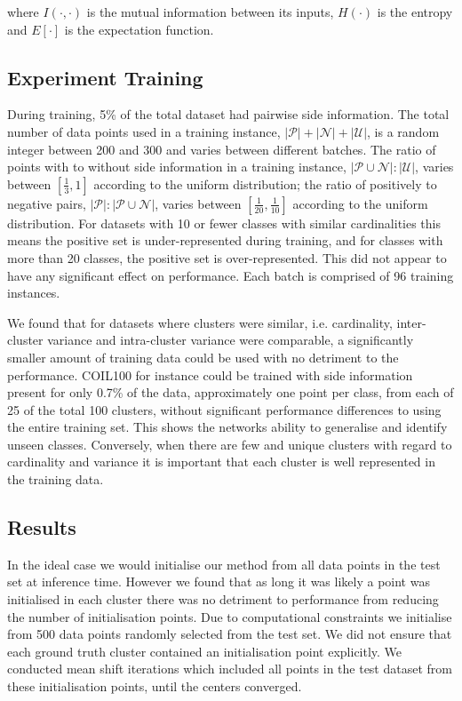 \documentclass[letterpaper, 11pt]{IEEEtran}
\begin{document}
where $ I(\cdot,\cdot)$ is the mutual information between its inputs, $H(\cdot)$ is the entropy and $E[\cdot]$ is the expectation function. 

\subsection{Experiment Training}
During training, 5\% of the total dataset had pairwise side information.
The total number of data points used in a training instance, $|\mathcal P|+|\mathcal N|+|\mathcal U|$, is a random integer between 200 and 300 and varies between different batches. 
The ratio of points with to without side information in a training instance, 
$|\mathcal P \cup \mathcal N| : |\mathcal U|$, varies between $[\frac{1}{3}, 1]$ 
according to the uniform distribution; 
the ratio of positively to negative pairs, $|\mathcal P|:|\mathcal P \cup \mathcal N|$, varies between $[\frac{1}{20}, \frac{1}{10}]$ according to the uniform distribution. 
For datasets with 10 or fewer classes with similar cardinalities this means the positive set is under-represented during training, and for classes with more than 20 classes, the positive set is over-represented. This did not appear to have any significant effect on performance. Each batch is comprised of 96 training instances.

We found that for datasets where clusters were similar,
i.e. cardinality, inter-cluster variance and intra-cluster variance were comparable, a significantly smaller amount of training data could be used with no detriment to the performance.
COIL100 for instance could be trained with side information present for only 0.7\% of the data, approximately one point per class, from each of 25 of the total 100 clusters, without significant performance differences to using the entire training set. This shows the networks ability to generalise and identify unseen classes.
Conversely, when there are few and unique clusters with regard to cardinality and variance it is important that each cluster is well represented in the training data.

\subsection{Results}\label{testandresults}

In the ideal case we would initialise our method from all data points in the test set at inference time. However we found that as long it was likely a point was initialised in each cluster there was no detriment to performance from reducing the number of initialisation points. Due to computational constraints we initialise from 500 data points randomly selected from the test set. We did not ensure that each ground truth cluster contained an initialisation point explicitly.
We conducted mean shift iterations which included all points in the test dataset from these initialisation points, until the centers converged. 
\end{document}
